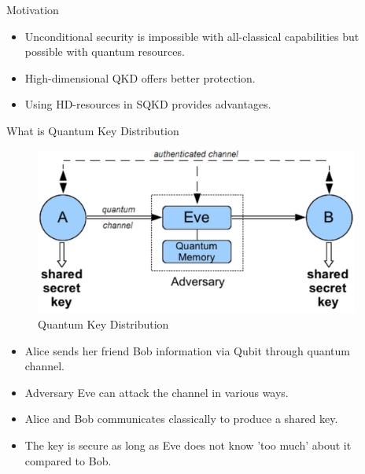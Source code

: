 \documentclass[final]{beamer}
\newlength{\sepwid}
\newlength{\onecolwid}
\begin{document}
\begin{frame}[t]
\begin{columns}[t]
\begin{column}{\onecolwid}
\begin{block}{Motivation}
\begin{itemize}
\item Unconditional security is impossible with all-classical capabilities but possible with quantum resources. 
\item High-dimensional QKD offers better protection.
\item Using HD-resources in SQKD provides advantages. 
\end{itemize}

\end{block}


\begin{block}{What is Quantum Key Distribution}
	
	\begin{figure}
		\includegraphics[width=\linewidth]{qkd.png}
		\caption{Quantum Key Distribution}
	\end{figure}
\begin{itemize}
\item Alice sends her friend Bob information via Qubit through quantum channel.
\item Adversary Eve can attack the channel in various ways.
\item Alice and Bob communicates classically to produce a shared key.
\item The key is secure as long as Eve does not know 'too much' about it compared to Bob.
\end{itemize}	
	
\end{block}


\end{column} %


\begin{column}{\sepwid}\end{column} %


\end{columns}
\end{frame}
\end{document}
